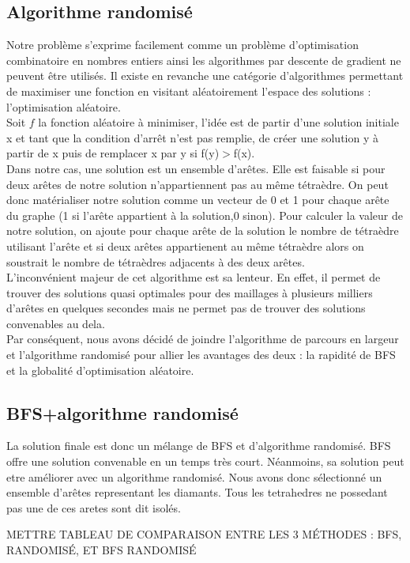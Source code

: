 \documentclass[a4paper,11pt,openany]{article}
\begin{document}
\subsection{Algorithme randomisé}
\noindent
Notre problème s'exprime facilement comme un problème d'optimisation combinatoire en nombres entiers ainsi les algorithmes par descente de gradient ne peuvent être utilisés. Il existe en revanche une catégorie d'algorithmes permettant de maximiser une fonction en visitant aléatoirement l'espace des solutions : l'optimisation aléatoire.\\
Soit $f$ la fonction aléatoire à minimiser, l'idée est de partir d'une solution initiale x et tant que la condition d'arrêt n'est pas remplie, de créer une solution y à partir de x puis de remplacer x par y si f(y)$>$f(x).\\
Dans notre cas, une solution est un ensemble d'arêtes. Elle est faisable si pour deux arêtes de notre solution n'appartiennent pas au même tétraèdre. On peut donc matérialiser notre solution comme un vecteur de 0 et 1 pour chaque arête du graphe (1 si l'arête appartient à la solution,0 sinon). Pour calculer la valeur de notre solution, on ajoute pour chaque arête de la solution le nombre de tétraèdre utilisant l'arête et si deux arêtes appartienent au même tétraèdre alors on soustrait le nombre de tétraèdres adjacents à des deux arêtes.\\
L'inconvénient majeur de cet algorithme est sa lenteur. En effet, il permet de trouver des solutions quasi optimales pour des maillages à plusieurs milliers d'arêtes en quelques secondes mais ne permet pas de trouver des solutions convenables au dela.\\
Par conséquent, nous avons décidé de joindre l'algorithme de parcours en largeur et l'algorithme randomisé pour allier les avantages des deux : la rapidité de BFS et la globalité d'optimisation aléatoire.
\subsection{BFS+algorithme randomisé}
La solution finale est donc un mélange de BFS et d'algorithme randomisé. BFS offre une solution convenable en un temps très court. Néanmoins, sa solution peut etre améliorer avec un algorithme randomisé.
Nous avons donc sélectionné un ensemble d'arêtes representant les diamants. Tous les tetrahedres ne possedant pas une de ces aretes sont dit isolés.

METTRE TABLEAU DE COMPARAISON ENTRE LES 3 MÉTHODES : BFS, RANDOMISÉ, ET BFS RANDOMISÉ
\end{document}
